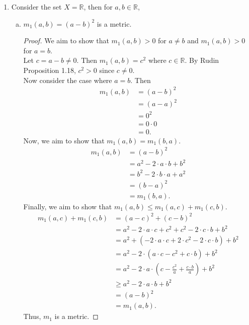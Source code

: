 \documentclass{amsart}
\begin{document}
\begin{enumerate}[1.]
\item Consider the set $X=\mathbb R$, then for $a,b\in \mathbb R$,
\begin{enumerate}[(a)]
\item $m_1(a,b) =(a-b)^2$ is a metric. \\
\begin{proof}
We aim to show that $m_1(a,b) > 0$ for $a \neq b$ and $m_1(a,b) > 0$ for $a = b$. \\
Let $c = a - b \neq 0$. Then $m_1(a,b) = c^2$ where $c \in \mathbb{R}$.
By Rudin Proposition 1.18, $c^2 > 0$ since $c \neq 0$. \\
Now consider the case where $a = b$. Then 
\begin{align*}
    m_1(a,b) &= (a - b)^2 \\
    &= (a - a)^2 \\
    &= 0^2 \\
    &= 0\cdot 0 \\
    &= 0.
\end{align*}
Now, we aim to show that $m_1(a,b) = m_1(b,a)$. \\
\begin{align*}
    m_1(a,b) &= (a - b)^2 \\
    &= a^2 -2\cdot a \cdot b + b^2 \\
    &= b^2 -2 \cdot b \cdot a + a^2 \\
    &= (b - a)^2 \\
    &= m_1(b,a).
\end{align*}
Finally, we aim to show that $m_1(a,b) \leq m_1(a,c) + m_1(c,b)$.
\begin{align*}
    m_1(a,c) + m_1(c,b) &= (a - c)^2 + (c - b)^2 \\
    &= a^2 -2\cdot a\cdot c + c^2 + c^2 -2\cdot c\cdot b + b^2 \\
    &= a^2 + (-2\cdot a \cdot c + 2\cdot c^2 - 2\cdot c\cdot b) + b^2 \\
    &= a^2 - 2\cdot( a \cdot c - c^2 + c\cdot b) + b^2 \\
    &= a^2 - 2\cdot a \cdot( c - \frac{c^2}{a} + \frac{c\cdot b}{a}) + b^2 \\
    &\geq a^2 - 2\cdot a \cdot b + b^2 \\
    &= (a - b)^2 \\
    &= m_1(a,b).
\end{align*}
Thus, $m_1$ is a metric.
\end{proof}
\end{enumerate}
\newpage


\end{enumerate}
\end{document}
